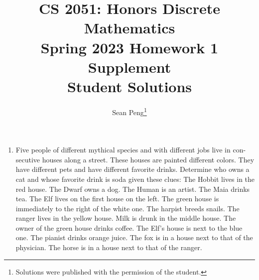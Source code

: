 \documentclass{article}
\title{\vspace{-1cm}CS 2051: Honors Discrete Mathematics \\Spring 2023 Homework 1 Supplement \\ Student Solutions}
\author{Sean Peng\footnote{Solutions were published with the permission of the student.}}
\date{}
\begin{document}
\maketitle

\begin{enumerate}
    \item Five people of different mythical species and with different jobs live in con- secutive houses along a street. These houses are painted different colors. They have different pets and have different favorite drinks. Determine who owns a cat and whose favorite drink is soda given these clues: The Hobbit lives in the red house. The Dwarf owns a dog. The Human is an artist. The Maia drinks tea. The Elf lives on the first house on the left. The green house is immediately to the right of the white one. The harpist breeds snails. The ranger lives in the yellow house. Milk is drunk in the middle house. The owner of the green house drinks coffee. The Elf’s house is next to the blue one. The pianist drinks orange juice. The fox is in a house next to that of the physician. The horse is in a house next to that of the ranger.


\end{enumerate}
\end{document}
